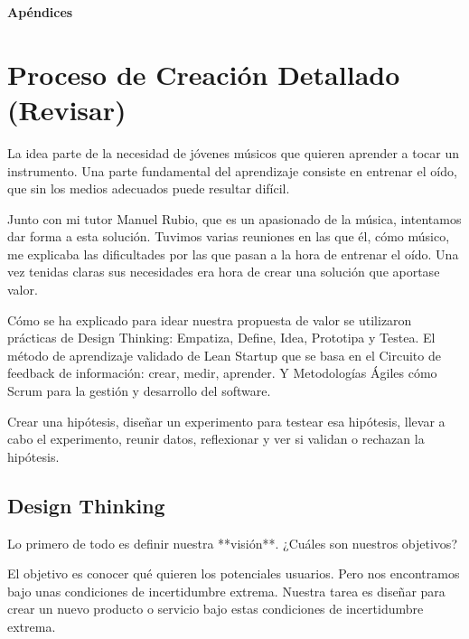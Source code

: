 \documentclass[12pt,twoside,titlepage]{report}
\begin{document}

\appendix
{}
{}
\mbox{}
\vfill
\begin{center}
\begin{Huge}
\textbf{Apéndices}
\end{Huge}
\end{center}
\vfill
\mbox{}
\thispagestyle{empty}
\newpage
\mbox{}
\thispagestyle{empty}
\newpage


\chapter{Proceso de Creación Detallado (Revisar)}

La idea parte de la necesidad de jóvenes músicos que quieren aprender a tocar un instrumento. Una parte fundamental del aprendizaje consiste en entrenar el oído, que sin los medios adecuados puede resultar difícil.

Junto con mi tutor Manuel Rubio, que es un apasionado de la música, intentamos dar forma a esta solución. Tuvimos varias reuniones en las que él, cómo músico, me explicaba las dificultades por las que pasan a la hora de entrenar el oído. Una vez tenidas claras sus necesidades era hora de crear una solución que aportase valor.

Cómo se ha explicado para idear nuestra propuesta de valor se utilizaron prácticas de Design Thinking: Empatiza, Define, Idea, Prototipa y Testea. El método de aprendizaje validado de Lean Startup que se basa en el Circuito de feedback de información: crear, medir, aprender. Y Metodologías Ágiles cómo Scrum para la gestión y desarrollo del software.

Crear una hipótesis, diseñar un experimento para testear esa hipótesis, llevar a cabo el experimento, reunir datos, reflexionar y ver si validan o rechazan la hipótesis.

\section{Design Thinking}

Lo primero de todo es definir nuestra **visión**. ¿Cuáles son nuestros objetivos?

El objetivo es conocer qué quieren los potenciales usuarios. Pero nos encontramos bajo unas condiciones de incertidumbre extrema. Nuestra tarea es diseñar para crear un nuevo producto o servicio bajo estas condiciones de incertidumbre extrema.
\end{document}
